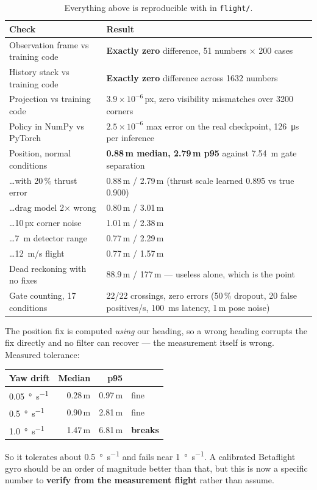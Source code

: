\begin{table}[H]\centering\footnotesize
\begin{tabularx}{\linewidth}{@{}p{4.3cm} X@{}}
\toprule
Check & Result \\
\midrule
Observation frame vs training code & \textbf{Exactly zero} difference, 51 numbers $\times$ 200 cases \\
History stack vs training code & \textbf{Exactly zero} difference across 1632 numbers \\
Projection vs training code & $3.9\times10^{-6}$\,px, zero visibility mismatches over 3200 corners \\
Policy in NumPy vs PyTorch & $2.5\times10^{-6}$ max error on the real checkpoint, \SI{126}{\micro s} per inference \\
Position, normal conditions & \textbf{0.88\,m median, 2.79\,m p95} against \SI{7.54}{m} gate separation \\
\dots with 20\,\% thrust error & 0.88\,m / 2.79\,m (thrust scale learned 0.895 vs true 0.900) \\
\dots drag model 2$\times$ wrong & 0.80\,m / 3.01\,m \\
\dots 10\,px corner noise & 1.01\,m / 2.38\,m \\
\dots \SI{7}{m} detector range & 0.77\,m / 2.29\,m \\
\dots \SI{12}{m/s} flight & 0.77\,m / 1.57\,m \\
Dead reckoning with no fixes & 88.9\,m / 177\,m --- useless alone, which is the point \\
Gate counting, 17 conditions & 22/22 crossings, zero errors (50\,\% dropout, 20 false positives/s, \SI{100}{ms} latency, 1\,m pose noise) \\
\bottomrule
\end{tabularx}
\caption{Everything above is reproducible with  in \nolinkurl{flight/}.}
\end{table}

\begin{warnbox}
The position fix is computed \emph{using} our heading, so a wrong heading
corrupts the fix directly and no filter can recover --- the measurement itself is
wrong. Measured tolerance:

\begin{center}\footnotesize
\begin{tabular}{@{}lrrl@{}}
\toprule
Yaw drift & Median & p95 & \\
\midrule
\SI{0.05}{\degree\per\second} & 0.28\,m & 0.97\,m & fine \\
\SI{0.5}{\degree\per\second} & 0.90\,m & 2.81\,m & fine \\
\SI{1.0}{\degree\per\second} & 1.47\,m & 6.81\,m & \textbf{breaks} \\
\bottomrule
\end{tabular}
\end{center}

So it tolerates about \SI{0.5}{\degree\per\second} and fails near
\SI{1}{\degree\per\second}. A calibrated Betaflight gyro should be an order of
magnitude better than that, but this is now a specific number to \textbf{verify
from the measurement flight} rather than assume.
\end{warnbox}
